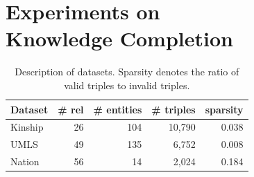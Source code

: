 \section{Experiments on \\ Knowledge Completion}
\label{sec:exp1}

\begin{table}[t]
\centering
\caption{\label{tbl:dataset}Description of datasets. 
Sparsity denotes the ratio of valid triples to invalid triples.}
\vskip 0.15in
\begin{tabular}{l | r | r | r | r}
Dataset &  \# rel & \# entities & \# triples & sparsity \\ \hline
Kinship & 26 & 104  & 10,790 & 0.038 \\
UMLS & 49 &135  & 6,752 & 0.008 \\
Nation & 56 & 14  & 2,024 & 0.184 \\
\end{tabular}
\end{table}



